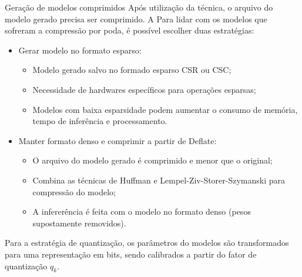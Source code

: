 \begin{frame}{Geração de modelos comprimidos}
    Após utilização da técnica, o arquivo do modelo gerado precisa ser comprimido. A Para lidar com os modelos que sofreram a compressão por poda, é possível escolher duas estratégias:
    \begin{itemize}
        \item Gerar modelo no formato esparso:
        \begin{itemize}
            \item Modelo gerado salvo no formado esparso CSR ou CSC;
            \item Necessidade de hardwares específicos para operações esparsas;
            \item Modelos com baixa esparsidade podem aumentar o consumo de memória, tempo de inferência e processamento.
        \end{itemize}
        \item Manter formato denso e comprimir a partir de Deflate:
        \begin{itemize}
            \item O arquivo do modelo gerado é comprimido e menor que o original;
            \item Combina as técnicas de Huffman e Lempel-Ziv-Storer-Szymanski para compressão do modelo;
            \item A infererência é feita com o modelo no formato denso (pesos supostamente removidos).
        \end{itemize}
    \end{itemize}
\end{frame}

\begin{frame}
    Para a estratégia de quantização, os parâmetros do modelos são transformados para uma representação em bits, sendo calibrados a partir do fator de quantização $q_k$.
\end{frame}